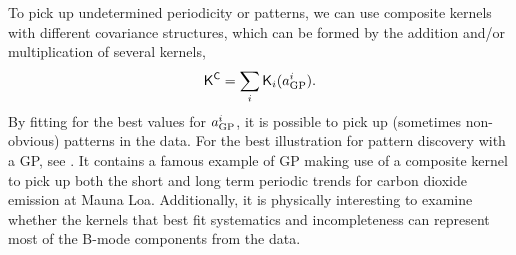 To pick up undetermined periodicity or patterns, 
we can use composite kernels with different covariance structures, 
which can be formed by the addition and/or multiplication of several kernels,
\begin{equation}
	\mathsf{K}^{\mathsf{C}} = \sum_i \mathsf{K}_i(a_{\rm GP}^i).
\end{equation}
By fitting for the best values for $a_{\rm GP}^i$, it is possible  
to pick up (sometimes non-obvious) patterns in the data. 
For the best illustration for pattern discovery with a GP, see
\cite{Duvenaud2013}.
It contains a famous example of GP making use of a composite kernel to pick up both the 
short and long term periodic trends for carbon dioxide emission at Mauna Loa.
Additionally, it is physically interesting to examine whether the kernels that best 
fit systematics and incompleteness can represent most of the B-mode components
from the data. 

% 



% 





